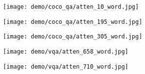\documentclass{article}
\begin{document}
\begin{figure}[tp]
\begin{minipage}{0.19\linewidth}
\texttt{[image: demo/coco\_qa/atten\_10\_word.jpg]}
\end{minipage}
\begin{minipage}{0.19\linewidth}
\texttt{[image: demo/coco\_qa/atten\_195\_word.jpg]}
\end{minipage}
\begin{minipage}{0.19\linewidth}
\texttt{[image: demo/coco\_qa/atten\_305\_word.jpg]}
\end{minipage}
\begin{minipage}{0.19\linewidth}
\texttt{[image: demo/vqa/atten\_658\_word.jpg]}
\end{minipage}
\begin{minipage}{0.19\linewidth}
\texttt{[image: demo/vqa/atten\_710\_word.jpg]}
\end{minipage}


\end{figure}
\end{document}
